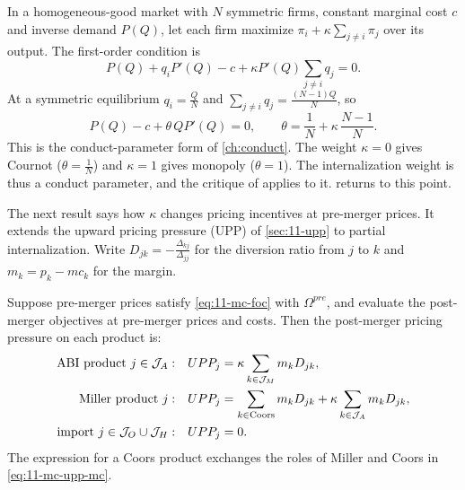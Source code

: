 \begin{remark}\label{rem:11-mc-theta}
In a homogeneous-good market with $N$ symmetric firms, constant marginal cost $c$ and inverse demand $P(Q)$, let each
firm maximize $\pi_i + \kappa\sum_{j \neq i}\pi_j$ over its output. The first-order condition is
\begin{equation*}
  P(Q) + q_i P'(Q) - c + \kappa P'(Q)\sum_{j \neq i}q_j = 0 .
\end{equation*}
At a symmetric equilibrium $q_i = \frac{Q}{N}$ and $\sum_{j\neq i}q_j = \frac{(N-1)Q}{N}$, so
\begin{equation*}
  P(Q) - c + \theta\, Q P'(Q) = 0, \qquad \theta = \frac{1}{N} + \kappa\,\frac{N-1}{N}.
\end{equation*}
This is the conduct-parameter form of \cref{ch:conduct}. The weight $\kappa = 0$ gives Cournot ($\theta = \frac{1}{N}$)
and $\kappa = 1$ gives monopoly ($\theta = 1$). The internalization weight is thus a conduct parameter, and the
critique of \citet{Corts1999} applies to it.  returns to this point.
\end{remark}

The next result says how $\kappa$ changes pricing incentives at pre-merger prices. It extends the upward pricing
pressure (UPP) of \cref{sec:11-upp} to partial internalization. Write $D_{jk} = -\frac{\Delta_{kj}}{\Delta_{jj}}$
for the diversion ratio from $j$ to $k$ and $m_k = p_k - mc_k$ for the margin.

\begin{proposition}\label{prop:11-mc-upp}
Suppose pre-merger prices satisfy \eqref{eq:11-mc-foc} with $\Omega^{pre}$, and evaluate the post-merger objectives at
pre-merger prices and costs. Then the post-merger pricing pressure on each product is:
\begin{align}
  \text{ABI product } j \in \mathcal{J}_A: &\quad UPP_j = \kappa\sum_{k \in \mathcal{J}_M} m_k D_{jk}, \label{eq:11-mc-upp-abi}\\
  \text{Miller product } j: &\quad UPP_j = \sum_{k \in \text{Coors}} m_k D_{jk} + \kappa\sum_{k \in \mathcal{J}_A} m_k D_{jk},
  \label{eq:11-mc-upp-mc}\\
  \text{import } j \in \mathcal{J}_O \cup \mathcal{J}_H: &\quad UPP_j = 0. \notag
\end{align}
The expression for a Coors product exchanges the roles of Miller and Coors in \eqref{eq:11-mc-upp-mc}.
\end{proposition}

